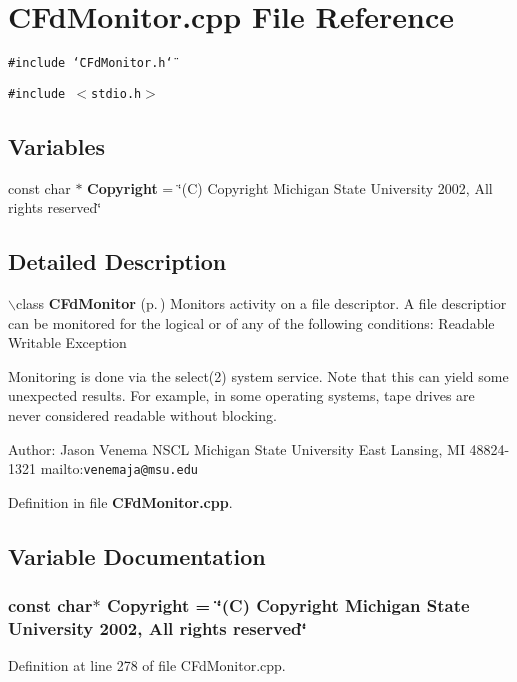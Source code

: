 \section{CFd\-Monitor.cpp File Reference}
\label{CFdMonitor_8cpp}
{\tt \#include \char`\"{}CFd\-Monitor.h\char`\"{}}\par
{\tt \#include $<$stdio.h$>$}\par
\subsection*{Variables}
\begin{CompactItemize}
\item 
const char $\ast$ {\bf Copyright} = \char`\"{}(C) Copyright Michigan State University 2002, All rights reserved\char`\"{}
\end{CompactItemize}


\subsection{Detailed Description}


$\backslash$class {\bf CFd\-Monitor} {\rm (p.\,\pageref{classCFdMonitor})} Monitors activity on a file descriptor. A file descriptior can be monitored for the logical or of any of the following conditions: Readable Writable Exception

Monitoring is done via the select(2) system service. Note that this can yield some unexpected results. For example, in some operating systems, tape drives are never considered readable without blocking.

Author: Jason Venema NSCL Michigan State University East Lansing, MI 48824-1321 mailto:{\tt venemaja@msu.edu}



Definition in file {\bf CFd\-Monitor.cpp}.

\subsection{Variable Documentation}
\subsubsection{\setlength{\rightskip}{0pt plus 5cm}const char$\ast$ Copyright = \char`\"{}(C) Copyright Michigan State University 2002, All rights reserved\char`\"{}\hspace{0.3cm}{\tt  [static]}}\label{CFdMonitor_8cpp_a0}




Definition at line 278 of file CFd\-Monitor.cpp.